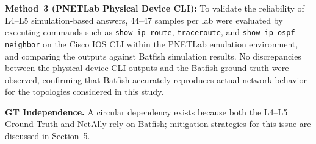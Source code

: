 


\textbf{Method~3 (PNETLab Physical Device CLI):}
To validate the reliability of L4--L5 simulation-based answers, 44--47 samples per lab were evaluated by executing commands such as \texttt{show ip route}, \texttt{traceroute}, and \texttt{show ip ospf neighbor} on the Cisco IOS CLI within the PNETLab emulation environment, and comparing the outputs against Batfish simulation results.
No discrepancies between the physical device CLI outputs and the Batfish ground truth were observed, confirming that Batfish accurately reproduces actual network behavior for the topologies considered in this study.

\textbf{GT Independence.}
A circular dependency exists because both the L4--L5 Ground Truth and NetAlly rely on Batfish; mitigation strategies for this issue are discussed in Section~5.


